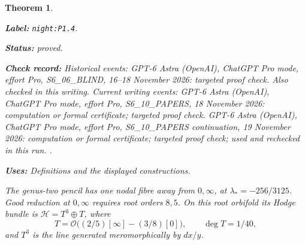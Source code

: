 \documentclass[11pt,a4paper]{article}
\newtheorem{theorem}{Theorem}[section]
\theoremstyle{definition}
\newcommand{\StatementRecord}[4]{\par\smallskip\begingroup\upshape\raggedright\noindent\textbf{Label:} \nolinkurl{#1}.\par\noindent\textbf{Status:} #2.\par\noindent\textbf{Check record:} #3.\par\noindent\textbf{Uses:} #4.\par\endgroup\smallskip}
\begin{document}
\begin{theorem}\label{night:P1.4}
\StatementRecord{night:P1.4}{proved}{Historical events: GPT-6 Astra (OpenAI), ChatGPT Pro mode, effort Pro, S6\_06\_BLIND, 16--18 November 2026: targeted proof check. Also checked in this writing. Current writing events: GPT-6 Astra (OpenAI), ChatGPT Pro mode, effort Pro, S6\_10\_PAPERS, 18 November 2026: computation or formal certificate; targeted proof check. GPT-6 Astra (OpenAI), ChatGPT Pro mode, effort Pro, S6\_10\_PAPERS continuation, 19 November 2026: computation or formal certificate; targeted proof check; used and rechecked in this run. }{Definitions and the displayed constructions}
The genus-two pencil has one nodal fibre away from $0,\infty$, at
$\lambda_*=-256/3125$.  Good reduction at $0,\infty$ requires root
orders $8,5$.  On this root orbifold its Hodge bundle is
$\mathcal H=T^3\oplus T$, where
\[
T=\mathcal O\bigl((2/5)[\infty]-(3/8)[0]\bigr),\qquad
\deg T=1/40,
\]
and $T^3$ is the line generated meromorphically by $dx/y$.
\end{theorem}
\end{document}
